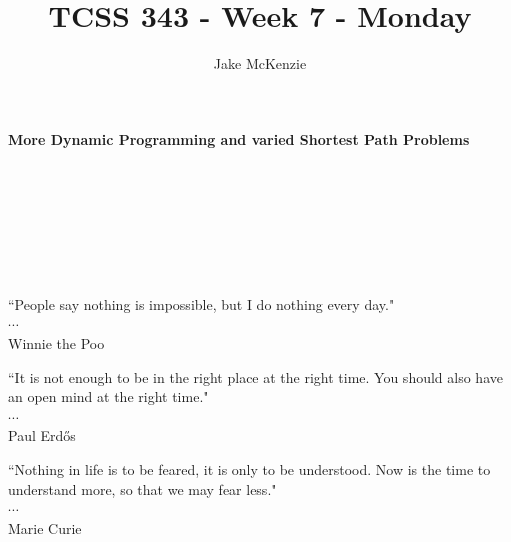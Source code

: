 \documentclass[12pt]{article}
\begin{document}
\title{TCSS 343 - Week 7 - Monday}
\author{Jake McKenzie}
\maketitle
\noindent\centerline{\textbf{More Dynamic Programming and varied Shortest Path Problems}}\\\\\\\\\\\\
\begin{center}
    ``People say nothing is impossible, but I do nothing every day." \\$\cdots$\\ Winnie the Poo
\end{center}
\begin{center}
    ``It is not enough to be in the right place at the right time. You should also have an open mind at the right time." \\$\cdots$\\ Paul Erd\H{o}s
\end{center}
\begin{center}
    ``Nothing in life is to be feared, it is only to be understood. Now is the time to understand more, 
    so that we may fear less." \\$\cdots$\\ Marie Curie
\end{center}
\newpage
\end{document}
